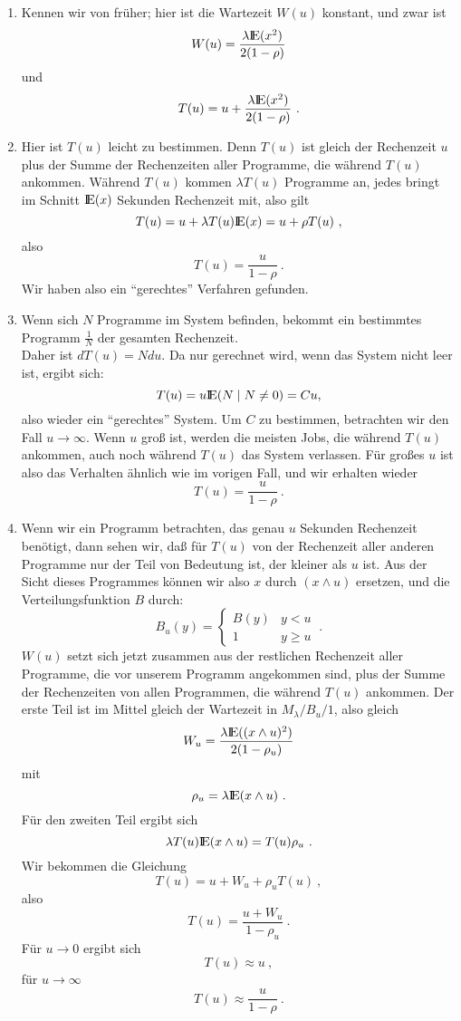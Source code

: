 \begin{enumerate}
\item Kennen wir von früher; hier ist die Wartezeit $W(u)$ konstant, und zwar ist
\[W(u) = \frac{\lambda {\rm I\kern-0.2em E}(x^{2})}{2(1-\rho)} \]
und
\[T(u) = u + \frac{\lambda {\rm I\kern-0.2em E}(x^{2})}{2(1-\rho)} ~.  \]
\item Hier ist $T(u)$ leicht zu bestimmen. Denn $T(u)$ ist gleich der Rechenzeit $u$ plus der Summe der Rechenzeiten aller Programme, die während $T(u)$
ankommen.
Während $T(u)$ kommen $\lambda T(u)$ Programme an, jedes bringt im Schnitt ${\rm I\kern-0.2em E}(x)$ Sekunden Rechenzeit mit, also gilt
\[T(u) = u + \lambda T(u){\rm I\kern-0.2em E}(x)=u + \rho T(u) ~,\]
also
\[T(u)=\frac{u}{1-\rho} ~. \]
Wir haben also ein \enquote{gerechtes} Verfahren gefunden.
\item Wenn sich $N$ Programme im System befinden, bekommt ein bestimmtes Programm $\frac{1}{N}$ der gesamten Rechenzeit. \\
Daher ist $dT(u) = Ndu$. Da nur gerechnet wird, wenn das System nicht leer ist, ergibt sich:
\[ T(u)=u{\rm I\kern-0.2em E}(N \mid N \not= 0)=Cu, \]
also wieder ein \enquote{gerechtes} System. Um $C$ zu bestimmen, betrachten wir den Fall $u \rightarrow \infty$. Wenn $u$ groß ist, werden die meisten Jobs, die während
$T(u)$ ankommen, auch noch während $T(u)$ das System verlassen. Für großes $u$ ist also das Verhalten ähnlich wie im vorigen Fall, und wir erhalten wieder
\[T(u)=\frac{u}{1-\rho} ~. \]
\item Wenn wir ein Programm betrachten, das genau $u$ Sekunden Rechenzeit benötigt, dann sehen wir, daß für $T(u)$ von der Rechenzeit aller anderen Programme
nur der Teil von Bedeutung ist, der kleiner als $u$ ist. Aus der Sicht dieses Programmes können wir also $x$ durch $(x \land u)$ ersetzen, und die
Verteilungsfunktion $B$ durch:
\[
B_{u}(y) =  \left\{
\begin{array}{lc}
B(y) & y<u \\
1 & y \geq u
\end{array} \right. ~.
\]
$W(u)$ setzt sich jetzt zusammen aus der restlichen Rechenzeit aller Programme, die vor unserem Programm angekommen sind, plus der Summe der Rechenzeiten von
allen Programmen, die während $T(u)$ ankommen. Der erste Teil ist im Mittel gleich der Wartezeit in $M_{\lambda}/B_{u}/1$, also gleich
\[W_{u}=\frac{\lambda {\rm I\kern-0.2em E}((x \land u)^{2})}{2(1-\rho _{u})}  \]
mit
\[\rho _{u}=\lambda {\rm I\kern-0.2em E}(x \wedge u) ~.\]
Für den zweiten Teil ergibt sich
\[\lambda T(u){\rm I\kern-0.2em E}(x \wedge u) = T(u)\rho _{u} ~.\]
Wir bekommen die Gleichung
\[T(u)=u+W_{u}+\rho _{u}T(u) ~,  \]
also
\[T(u)=\frac{u+W_{u}}{1-\rho_{u}} ~. \]
Für $u \rightarrow 0$ ergibt sich
\[T(u) \approx u ~, \]
für $u \rightarrow \infty$
\[T(u) \approx \frac{u}{1-\rho} ~. \]
\end{enumerate}

